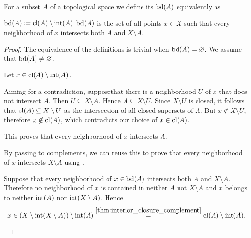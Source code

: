 \begin{definition}\label{def:topological_boundary}
  For a subset \( A \) of a topological space we define its  \( \operatorname{bd}(A) \) equivalently as
  \begin{defenum}
     \( \operatorname{bd}(A) \coloneqq \operatorname{cl}(A) \setminus \operatorname{int}(A) \)
     \( \operatorname{bd}(A) \) is the set of all points \( x \in X \) such that every neighborhood of \( x \) intersects both \( A \) and \( X \setminus A \).
  \end{defenum}
\end{definition}
\begin{proof}
  The equivalence of the definitions is trivial when \( \operatorname{bd}(A) = \varnothing \). We assume that \( \operatorname{bd}(A) \neq \varnothing \).

  \begin{description}
     Let \( x \in \operatorname{cl}(A) \setminus \operatorname{int}(A) \).

    Aiming for a contradiction, suppose\LEM that there is a neighborhood \( U \) of \( x \) that does not intersect \( A \). Then \( U \subseteq X \setminus A \). Hence \( A \subseteq X \setminus U \). Since \( X \setminus U \) is closed, it follows that \( \operatorname{cl}(A) \subseteq X \setminus U \) as the intersection of all closed supersets of \( A \). But \( x \not\in X \setminus U \), therefore \( x \not\in \operatorname{cl}(A) \), which contradicts our choice of \( x \in \operatorname{cl}(A) \).

    This proves that every neighborhood of \( x \) intersects \( A \).

    By passing to complements, we can reuse this to prove that every neighborhood of \( x \) intersects \( X \setminus A \) using .

     Suppose that every neighborhood of \( x \in \operatorname{bd}(A) \) intersects both \( A \) and \( X \setminus A \). Therefore no neighborhood of \( x \) is contained in neither \( A \) not \( X \setminus A \) and \( x \) belongs to neither \( \operatorname{int}(A) \) nor \( \operatorname{int}(X \setminus A) \). Hence
    \begin{equation*}
      x \in (X \setminus \operatorname{int}(X \setminus A)) \setminus \operatorname{int}(A) \overset {\ref{thm:interior_closure_complement}} = \operatorname{cl}(A) \setminus \operatorname{int}(A).
    \end{equation*}
  \end{description}
\end{proof}

